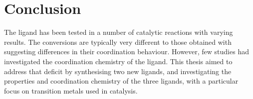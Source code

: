 
\chapter{Conclusion}
\label{ch:conclusion}


The \tBuxantphos{} ligand has been tested in a number of catalytic reactions with varying results.\cite{Mispelaere2005, Dongol2007, Ohshima2009, Cabello2007, Zhan2012, Ashcroft2013, Behr2013, Friis2014, Raoufmoghaddam2013}  The conversions are typically very different to those obtained with \Phxantphos{} suggesting differences in their coordination behaviour.  However, few studies had investigated the coordination chemistry of the \tBuxantphos{} ligand.  This thesis aimed to address that deficit by synthesising two new \tBuxantphos{} ligands, and investigating the properties and coordination chemistry of the three ligands, with a particular focus on transition metals used in catalysis.  



